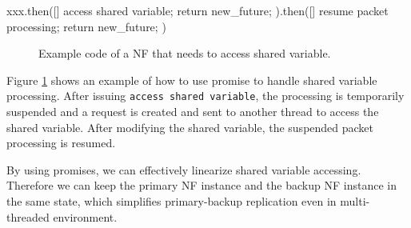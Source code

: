 \begin{verbbox}
xxx.then([]{
  access shared variable;
  return new_future;
}).then([]{
  resume packet processing;
  return new_future;
})
  
\end{verbbox}
\begin{figure}[!h]
\resizebox{0.5\columnwidth}{!}{\theverbbox}
\caption{Example code of a NF that needs to access shared variable.} 
\label{fig:asv}
\end{figure}

Figure \ref{fig:asv} shows an example of how to use promise to handle shared
variable processing. After issuing \verb!access shared variable!, the processing
is temporarily suspended and a request is created and sent to another thread to
access the shared variable. After modifying the shared variable, the suspended
packet processing is resumed.

By using promises, we can effectively linearize shared variable
accessing. Therefore we can keep the primary NF instance and the backup NF
instance in the same state, which simplifies primary-backup replication even in
multi-threaded environment.


